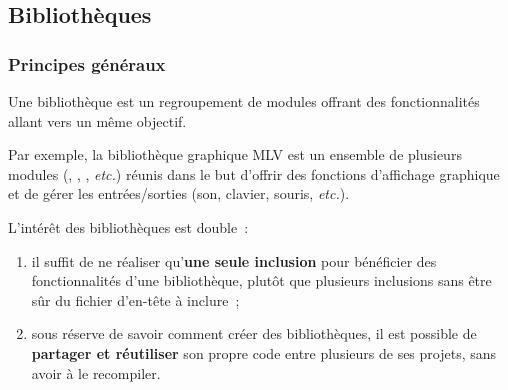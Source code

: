 \subsection{Bibliothèques}

\begin{frame}[fragile]
\frametitle{Principes généraux}
Une \alert{bibliothèque} est un regroupement de modules offrant des
fonctionnalités allant vers un même objectif.
\medskip

Par exemple, la bibliothèque graphique {\sf MLV} est un ensemble de
plusieurs modules (, ,
, {\em etc.}) réunis dans le but d'offrir des fonctions
d'affichage graphique et de gérer les entrées/sorties
(son, clavier, souris, {\em etc.}).
\medskip

L'intérêt des bibliothèques est double~:
\begin{enumerate}
    \item il suffit de ne réaliser qu'{\bf une seule inclusion} pour
    bénéficier des fonctionnalités d'une bibliothèque, plutôt que
    plusieurs inclusions sans être sûr du fichier d'en-tête à inclure~;
    \smallskip

    \item sous réserve de savoir comment créer des bibliothèques, il est
    possible de {\bf partager et réutiliser} son propre code entre
    plusieurs de ses projets, sans avoir à le recompiler.
\end{enumerate}
\end{frame}

